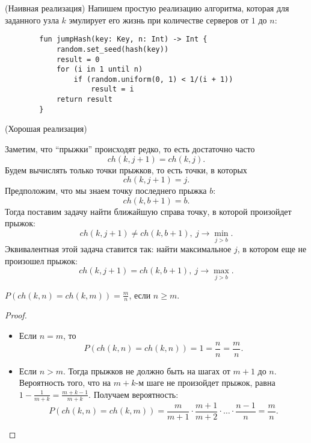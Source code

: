 \begin{algorithm}(Наивная реализация)
    Напишем простую реализацию алгоритма, которая для заданного узла
    $k$ эмулирует его жизнь при количестве серверов от $1$ до $n$:
    \begin{lstlisting}
        fun jumpHash(key: Key, n: Int) -> Int {
            random.set_seed(hash(key))
            result = 0
            for (i in 1 until n)
                if (random.uniform(0, 1) < 1/(i + 1))
                    result = i
            return result
        }
    \end{lstlisting}
\end{algorithm}

\begin{algorithm}(Хорошая реализация)

    Заметим, что ``прыжки'' происходят редко, то есть достаточно часто
    \[
        ch(k, j + 1) = ch(k, j)
    .\]
    Будем вычислять только точки прыжков, то есть точки, в которых
    \[
        ch(k, j + 1) = j
    .\]
    Предположим, что мы знаем точку последнего прыжка $b$:
    \[
        ch(k, b + 1) = b
    .\]
    Тогда поставим задачу найти ближайшую справа точку, в которой произойдет
    прыжок:
    \[
        ch(k, j + 1) \neq ch(k, b + 1),~ j \to \min_{j > b}
    .\]
    Эквивалентная этой задача ставится так: найти максимальное $j$, в котором
    еще не произошел прыжок:
    \[
        ch(k, j + 1) = ch(k, b + 1),~ j \to \max_{j > b}
    .\]
\end{algorithm}

\begin{lemma}
    $P(ch(k, n) = ch(k, m)) = \frac{m}{n}$, если $n \geqslant m$.
\end{lemma}
\begin{proof}
    \enewline
    \begin{itemize}
        \item Если $n = m$, то
            \[
                P(ch(k, n) = ch(k, n)) = 1 = \frac{n}{n} = \frac{m}{n}
            .\]
        \item Если $n > m$. Тогда прыжков не должно быть на шагах от
            $m + 1$ до $n$. Вероятность того, что на $m + k$-м шаге не произойдет
            прыжок, равна $1 - \frac{1}{m + k} = \frac{m + k - 1}{m + k}$.
            Получаем вероятность:
            \[
                P(ch(k, n) = ch(k, m)) = \frac{m}{m + 1} \cdot \frac{m + 1}{m + 2}
                \cdot \ldots \cdot \frac{n - 1}{n} = \frac{m}{n}
            .\]
    \end{itemize}
\end{proof}

